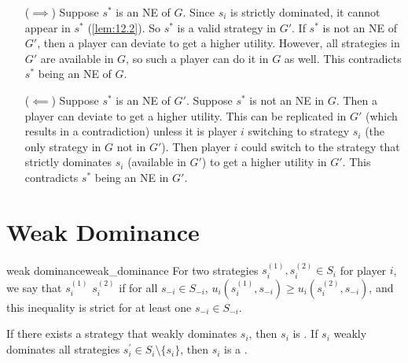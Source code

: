 \documentclass[12pt,letterpaper]{report}
\begin{document}
\begin{thmproof}
  \begin{itemize}[leftmargin=4em]
    \item[($\implies$)]
      Suppose $s^*$ is an NE of $G$.
      Since $s_i$ is strictly dominated, it cannot appear in $s^*$ (\cref{lem:12.2}).
      So $s^*$ is a valid strategy in $G'$.
      If $s^*$ is not an NE of $G'$, then a player can deviate to get a higher utility.
      However, all strategies in $G'$ are available in $G$, so such a player can do it in $G$ as
      well.
      This contradicts $s^*$ being an NE of $G$.
    \item[($\impliedby$)]
      Suppose $s^*$ is an NE of $G'$.
      Suppose $s^*$ is not an NE in $G$.
      Then a player can deviate to get a higher utility.
      This can be replicated in $G'$ (which results in a contradiction) unless it is player $i$
      switching to strategy $s_i$ (the only strategy in $G$ not in $G'$).
      Then player $i$ could switch to the strategy that strictly dominates $s_i$ (available in $G'$)
      to get a higher utility in $G'$.
      This contradicts $s^*$ being an NE in $G'$.
  \end{itemize}
\end{thmproof}

\section{Weak Dominance}

\begin{defn}{weak dominance}{weak_dominance}
  For two strategies $s_i^{(1)}, s_i^{(2)} \in S_i$ for player $i$, we say that $s_i^{(1)}$
   $s_i^{(2)}$ if for all $s_{-i} \in S_{-i}$,
  $u_i(s_i^{(1)}, s_{-i}) \geq u_i(s_i^{(2)}, s_{-i})$, and this inequality is strict for at least
  one $s_{-i} \in S_{-i}$.

  If there exists a strategy that weakly dominates $s_i$, then $s_i$ is
  .
  If $s_i$ weakly dominates all strategies $s_i^\prime \in S_i \setminus \{ s_i \}$, then $s_i$ is
  a .
\end{defn}
\end{document}
